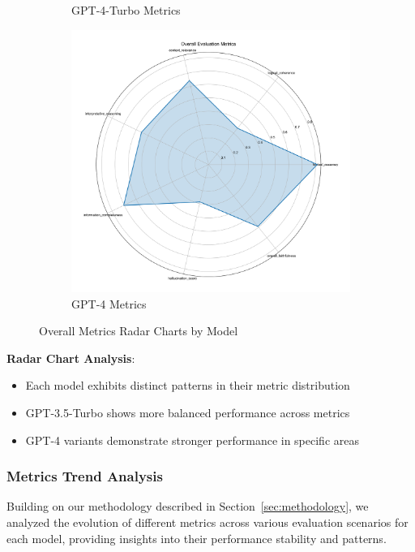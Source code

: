 \begin{figure}[!htbp]
\begin{subfigure}[b]{0.32\textwidth}
    \caption{GPT-4-Turbo Metrics}
    \label{fig:overall_metrics_radar_gpt4t}
\end{subfigure}
\hfill
\begin{subfigure}[b]{0.32\textwidth}
    \centering
    \includegraphics[width=\textwidth]{figures/overall/overall_metrics_radar_gpt-4.png}
    \caption{GPT-4 Metrics}
    \label{fig:overall_metrics_radar_gpt4}
\end{subfigure}
\caption{Overall Metrics Radar Charts by Model}
\label{fig:overall_metrics_radar}
\end{figure}

\textbf{Radar Chart Analysis}:
\begin{itemize}
    \item Each model exhibits distinct patterns in their metric distribution
    \item GPT-3.5-Turbo shows more balanced performance across metrics
    \item GPT-4 variants demonstrate stronger performance in specific areas
\end{itemize}

\subsubsection{Metrics Trend Analysis}
Building on our methodology described in Section~\ref{sec:methodology}, we analyzed the evolution of different metrics across various evaluation scenarios for each model, providing insights into their performance stability and patterns.

